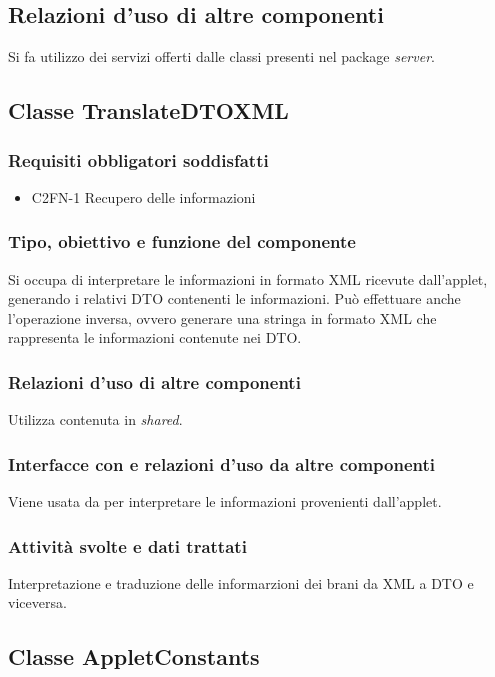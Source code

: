 \subsection*{Relazioni d'uso di altre componenti}
Si fa utilizzo dei servizi offerti dalle classi presenti nel package
\emph{server}.

\subsection{Classe TranslateDTOXML}
\subsubsection*{Requisiti obbligatori soddisfatti}
\begin{itemize}
	\item C2FN-1 Recupero delle informazioni
\end{itemize}
\subsubsection*{Tipo, obiettivo e funzione del componente}
Si occupa di interpretare le informazioni in formato XML ricevute dall'applet,
generando i relativi DTO contenenti le informazioni. Pu\`o effettuare anche
l'operazione inversa, ovvero generare una stringa in formato XML che rappresenta
le informazioni contenute nei DTO.

\subsubsection*{Relazioni d'uso di altre componenti}
Utilizza  contenuta in \emph{shared}.

\subsubsection*{Interfacce con e relazioni d'uso da altre componenti}
Viene usata da  per interpretare le informazioni provenienti
dall'applet.

\subsubsection*{Attivit\`a svolte e dati trattati}
Interpretazione e traduzione delle informarzioni dei brani da XML a DTO e
viceversa.

\subsection{Classe AppletConstants}
